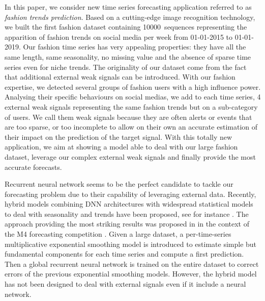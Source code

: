 \documentclass{article} %
\newcommand{\numberts}{10000}
\begin{document}
In this paper, we consider  new time series forecasting application referred to as {\em fashion trends prediction}. Based on a cutting-edge image recognition technology, we built the first fashion dataset containing \numberts\ sequences representing the apparition of fashion trends on social media per week from 01-01-2015 to 01-01-2019. Our fashion time series has very appealing properties: they have all the same length, same seasonality, no missing value and the absence of sparse time series even for niche trends. The originality of our dataset come from the fact that additional external weak signals can be introduced. With our fashion expertise, we detected several groups of fashion users with a high influence power. Analysing their specific behaviours on social medias, we add to each time series, 4 external weak signals representing the same fashion trends but on a sub-category of users. We call them weak signals because they are often alerts or events that are too sparse, or too incomplete to allow on their own an accurate estimation of their impact on the prediction of the target signal. With this totally new application, we aim at showing a model able to deal with our large fashion dataset, leverage our complex external weak signals and finally provide the most accurate forecasts.
 
Recurrent neural network seems to be the perfect candidate to tackle our forecasting problem due to their capability of leveraging external data.  Recently, hybrid models combining DNN architectures with widespread statistical models to deal with seasonality and trends have been proposed, see for instance  \citep{zhang2003time,jianwei2019novel,bandara2020lstm}. The approach providing the most striking results was proposed in  \citep{smyl2020hybrid} in the context of the M4 forecasting competition \citep{makridakis2020m4}.  Given a large dataset, a per-time-series multiplicative exponential smoothing model is introduced to estimate simple but fundamental components for each time series and compute a first prediction. Then a global recurrent neural network is trained on the entire dataset to correct errors of the previous exponential smoothing models. %
However, the hybrid model has not been designed to deal with external signals even if it include a neural network.
\end{document}
